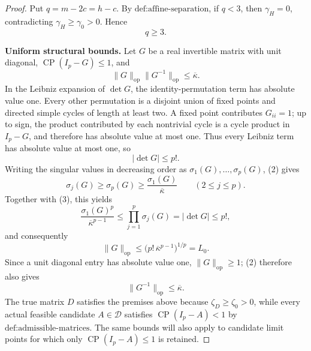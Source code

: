 \documentclass{article}
\begin{document}
\begin{proof}
Put \(q=m-2c=h-c\). By \(\text{def:affine-separation}\), if \(q<3\), then \(\gamma_H=0\), contradicting \(\gamma_H\geq\gamma_0>0\). Hence
\[
q\geq3.
\tag{1}
\]

\textbf{Uniform structural bounds.}
Let \(G\) be a real invertible matrix with unit diagonal, \(\operatorname{CP}(I_p-G)\leq1\), and
\[
\|G\|_{\mathrm{op}}\|G^{-1}\|_{\mathrm{op}}
\leq\overline\kappa.
\tag{2}
\]
In the Leibniz expansion of \(\det G\), the identity-permutation term has absolute value one. Every other permutation is a disjoint union of fixed points and directed simple cycles of length at least two. A fixed point contributes \(G_{ii}=1\); up to sign, the product contributed by each nontrivial cycle is a cycle product in \(I_p-G\), and therefore has absolute value at most one. Thus every Leibniz term has absolute value at most one, so
\[
|\det G|\leq p!.
\tag{3}
\]
Writing the singular values in decreasing order as \(\sigma_1(G),\ldots,\sigma_p(G)\), (2) gives
\[
\sigma_j(G)\geq\sigma_p(G)
\geq\frac{\sigma_1(G)}{\overline\kappa}
\qquad(2\leq j\leq p).
\]
Together with (3), this yields
\[
\frac{\sigma_1(G)^p}{\overline\kappa^{p-1}}
\leq\prod_{j=1}^p\sigma_j(G)
=|\det G|
\leq p!,
\]
and consequently
\[
\|G\|_{\mathrm{op}}
\leq\bigl(p!\,\overline\kappa^{p-1}\bigr)^{1/p}
=L_0.
\tag{4}
\]
Since a unit diagonal entry has absolute value one, \(\|G\|_{\mathrm{op}}\geq1\); (2) therefore also gives
\[
\|G^{-1}\|_{\mathrm{op}}\leq\overline\kappa.
\tag{5}
\]
The true matrix \(D\) satisfies the premises above because \(\zeta_D\geq\zeta_0>0\), while every actual feasible candidate \(A\in\mathcal D\) satisfies \(\operatorname{CP}(I_p-A)<1\) by \(\text{def:admissible-matrices}\). The same bounds will also apply to candidate limit points for which only \(\operatorname{CP}(I_p-A)\leq1\) is retained.


\end{proof}
\end{document}
